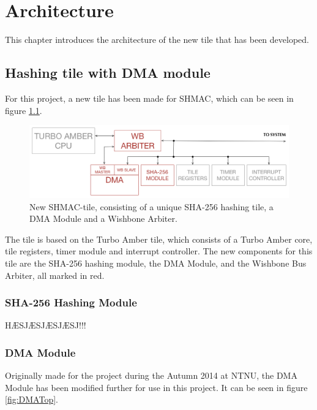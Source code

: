 \chapter{Architecture}
\label{cha:architecture}

This chapter introduces the architecture of the new tile that has been developed. 

\section{Hashing tile with DMA module}

For this project, a new tile has been made for SHMAC, which can be seen in figure \ref{fig:SHA-Tile}.

\begin{figure}[htb]
    \centering
    \includegraphics[width=1.0\textwidth]{Figures/Tile/HashingTile}
    \caption{New SHMAC-tile, consisting of a unique SHA-256 hashing tile, a DMA Module and a Wishbone Arbiter.}
    \label{fig:SHA-Tile}
\end{figure}

The tile is based on the Turbo Amber tile, which consists of a Turbo Amber core, tile registers, timer module and interrupt controller.
The new components for this tile are the SHA-256 hashing module, the DMA Module, and the Wishbone Bus Arbiter, all marked in red.

\subsection{SHA-256 Hashing Module}
HÆSJÆSJÆSJÆSJ!!!


\subsection{DMA Module}
Originally made for the  project during the Autumn 2014 at NTNU, the DMA Module has been modified further for use in this project.
It can be seen in figure \ref{fig:DMATop}.


